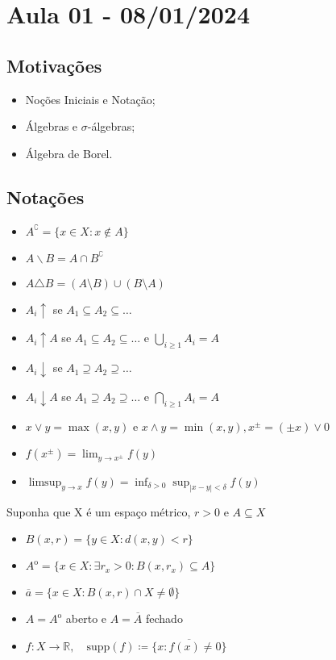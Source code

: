 \documentclass[measure_theory.tex]{subfiles}
\begin{document}
\section{Aula 01 - 08/01/2024}
\subsection{Motivações}
\begin{itemize}
	\item Noções Iniciais e Notação;
	\item Álgebras e \(\sigma \)-álgebras;
	\item Álgebra de Borel.
\end{itemize}
\subsection{Notações}
\begin{itemize}
	\item \(A ^{\complement} = \{x\in X: x\not\in A\}\)
	\item \(A\backslash B = A\cap B ^{\complement}\)
	\item \(A\triangle B = (A\setminus{B})\cup (B\setminus{A})\)
	\item \(A_{i}\uparrow \) se \(A_{1}\subseteq A_{2}\subseteq \dotsc \)
	\item \(A_{i}\uparrow A\) se \(A_{1}\subseteq A_{2}\subseteq \dotsc \) e \(\bigcup_{i\geq 1}^{}A_{i} = A\)
	\item \(A_{i} \downarrow \) se \(A_{1}\supseteq A_{2}\supseteq \dotsc \)
	\item \(A_{i} \downarrow A\) se \(A_{1}\supseteq A_{2}\supseteq \dotsc \) e \(\bigcap_{i\geq 1}^{}A_{i} = A\)
	\item \(x\vee y = \max(x, y)\) e \(x\wedge y = \min(x, y), x^{\pm} = (\pm x)\vee 0\)
	\item \(f(x^{\pm}) = \lim_{y\to x^{\pm}}f(y)\)
	\item \(\limsup_{y\to x}f(y) = \inf_{\delta > 0}\sup_{|x-y|<\delta }f(y)\)
\end{itemize}

Suponha que X é um espaço métrico, \(r > 0\) e \(A\subseteq X\)
\begin{itemize}
	\item \(B(x, r) = \{y\in X: d(x, y) < r\}\)
	\item \(A^{\mathrm{o}} = \{x\in X: \exists r_{x} > 0: B(x, r_{x})\subseteq A\}\)
	\item \(\overline{a} = \{x\in X: B(x, r)\cap X \neq\emptyset\}\)
	\item  \(A = A ^{\mathrm{o}}\) aberto e \(A = \overline{A} \) fechado
	\item \(f:X\rightarrow \mathbb{R},\quad \mathrm{supp}(f)\coloneqq \overline{\{x: f(x)\neq 0\}}\)
\end{itemize}
\end{document}
